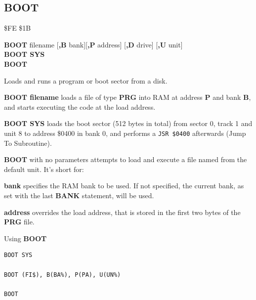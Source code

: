 \subsection{BOOT}
\begin{description}[leftmargin=2cm,style=nextline]
\item [Token:]    \$FE \$1B

\item [Format:]   {\bf BOOT} filename [{\bf,B} bank][{\bf,P} address] [{\bf,D} drive] [{\bf,U} unit] \\
                  {\bf BOOT SYS} \\
                  {\bf BOOT}

\item [Usage:]    Loads and runs a program or boot sector from a disk.

                  {\bf BOOT filename} loads a file of type {\bf PRG} into RAM at address {\bf P} and bank {\bf B}, and starts executing the code at the load address.

                  {\bf BOOT SYS} loads the boot sector (512 bytes in total) from sector 0, track 1 and unit 8 to address \$0400 in bank 0, and performs a \texttt{JSR \$0400} afterwards (Jump To Subroutine).

                  {\bf BOOT} with no parameters attempts to load and execute a file named  from the default unit. It's short for: 

                  \filenamedefinition

                  {\bf bank} specifies the RAM bank to be used. If not specified, the current bank, as set with the last {\bf BANK} statement, will be used.

                  {\bf address} overrides the load address, that is stored in the first two bytes of the {\bf PRG} file.

                  \drivedefinition

                  \unitdefinition

\item [Examples:] Using {\bf BOOT}

\begin{tcolorbox}[colback=black,coltext=white]
\verbatimfont{\codefont}
\begin{verbatim}
BOOT SYS

BOOT (FI$), B(BA%), P(PA), U(UN%)

BOOT
\end{verbatim}
\end{tcolorbox}
\end{description}


